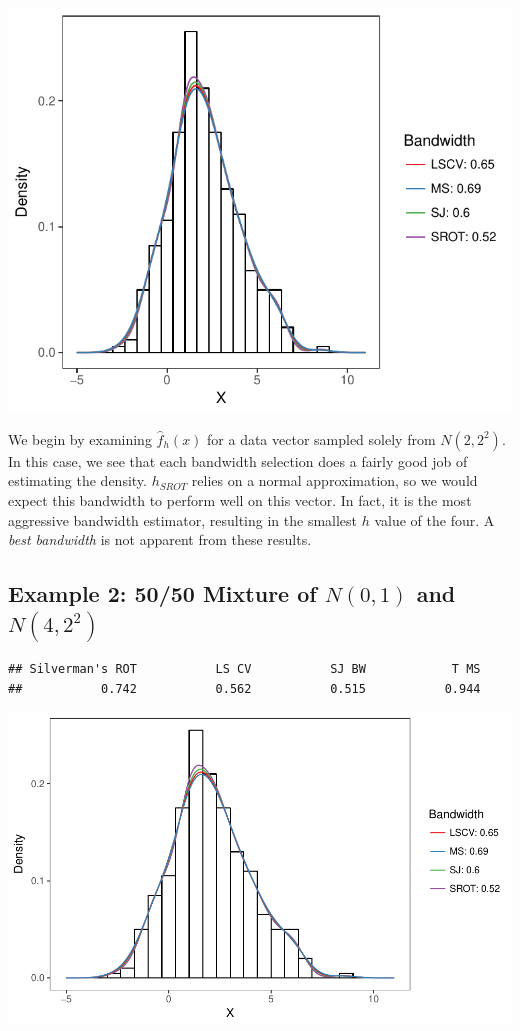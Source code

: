 \documentclass[]{article}
\begin{document}
\includegraphics{FinalReport_files/figure-latex/unnamed-chunk-5-1.pdf}

We begin by examining \(\widehat{f}_h(x)\) for a data vector sampled
solely from \(N(2, 2^2)\). In this case, we see that each bandwidth
selection does a fairly good job of estimating the density. \(h_{SROT}\)
relies on a normal approximation, so we would expect this bandwidth to
perform well on this vector. In fact, it is the most aggressive
bandwidth estimator, resulting in the smallest \(h\) value of the four.
A \emph{best bandwidth} is not apparent from these results.

\subsection{Example 2: 50/50 Mixture of $N(0, 1)$ and $N(4, 2^2)$}

\begin{verbatim}
## Silverman's ROT           LS CV           SJ BW            T MS 
##           0.742           0.562           0.515           0.944
\end{verbatim}

\includegraphics{FinalReport_files/figure-latex/unnamed-chunk-6-1.pdf}
\end{document}
